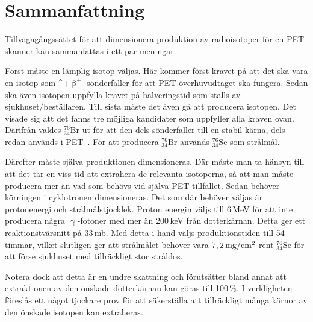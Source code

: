 \documentclass[11pt,a4paper, german, english, swedish
]{article}
\newcommand{\BP}{\ifmmode\upbeta^{+}\else$\upbeta^{\!+}$\fi}
\newcommand{\G}{\ifmmode\upgamma\else$\upgamma$\fi}
\begin{document}
\section{Sammanfattning}
Tillvägagångssättet för att dimensionera produktion av radioisotoper för en PET-skanner kan sammanfattas i ett par meningar. 

Först måste en lämplig isotop väljas. Här kommer först kravet på att det ska vara en isotop som \BP-sönderfaller för att PET överhuvudtaget ska fungera. Sedan ska även isotopen uppfylla kravet på halveringstid som ställs av sjukhuset/beställaren. Till sista måste det även gå att producera isotopen. Det visade sig att det fanns tre möjliga kandidater som uppfyller alla kraven ovan. Därifrån valdes $^{76}_{34}\mathrm{Br}$ ut för att den dels sönderfaller till en stabil kärna, dels redan används i PET~\cite{Lapi_PET,Valette_etal1993,Lovqvist_etal1997,Ribeiro_etal1999}. För att producera $^{76}_{34}\mathrm{Br}$ används $^{76}_{34}\mathrm{Se}$ som strålmål.

Därefter måste själva produktionen dimensioneras. Där måste man ta hänsyn till att det tar en viss tid att extrahera de relevanta isotoperna, så att man måste producera mer än vad som behövs vid själva PET-tillfället. Sedan behöver körningen i cyklotronen dimensioneras. Det som där behöver väljas är protonenergi och strålmålstjocklek. Proton energin väljs till 6\,MeV för att inte producera några \G-fotoner med mer än 200\,keV från dotterkärnan. Detta ger ett reaktionstvärsnitt på 33\,mb. Med detta i hand väljs produktionstiden till 54\,timmar, vilket slutligen ger att strålmålet behöver vara $\unit[7,2]{mg/cm^2}$ rent $^{76}_{34}\mathrm{Se}$ för att förse sjukhuset med tillräckligt stor stråldos. 

Notera dock att detta är en undre skattning och förutsätter bland annat att extraktionen av den önskade dotterkärnan kan göras till 100\,\%. I verkligheten föreslås ett något tjockare prov för att säkerställa att tillräckligt många kärnor av den önskade isotopen kan extraheras. 





\newpage

\end{document}
